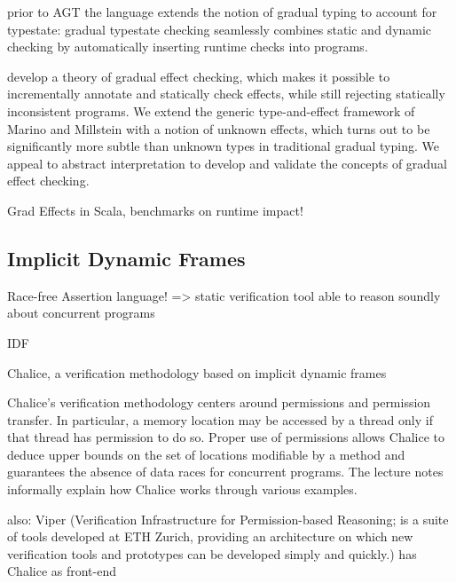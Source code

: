 prior to AGT
\cite{wolff2011gradual}
the language extends the notion of gradual typing to account for typestate: gradual typestate
checking seamlessly combines static and dynamic checking by automatically
inserting runtime checks into programs.

\cite{banados2014theory}
 develop a theory of gradual effect checking, which
 makes it possible to incrementally annotate and statically check
 effects, while still rejecting statically inconsistent programs. We
 extend the generic type-and-effect framework of Marino and Millstein
 with a notion of unknown effects, which turns out to be significantly
 more subtle than unknown types in traditional gradual
 typing. We appeal to abstract interpretation to develop and validate
 the concepts of gradual effect checking.

\cite{toro2015customizable}
Grad Effects in Scala, benchmarks on runtime impact!

\subsection{Implicit Dynamic Frames}

Race-free Assertion language! => static verification tool able to reason soundly about concurrent programs


\cite{smans2009implicit}
IDF


\cite{leino2009verification}
Chalice, a verification methodology based on implicit dynamic frames

Chalice’s verification methodology centers around permissions and permission transfer. In particular, a memory location may be accessed by a thread only if that thread has permission to do so. Proper use of permissions allows Chalice to deduce upper bounds on the set of locations modifiable by a method and guarantees the absence of data races for concurrent programs. The lecture notes informally explain how Chalice works through various examples.

also: Viper (Verification Infrastructure for Permission-based Reasoning; is a suite of tools developed at ETH Zurich, providing an architecture on which new verification tools and prototypes can be developed simply and quickly.) has Chalice as front-end

